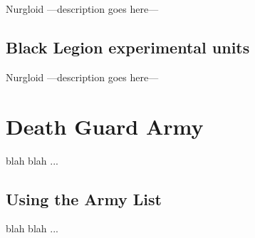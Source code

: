 \documentclass[a4paper, twocolumn]{article}
\begin{document}
\unit{Nurgloid} {							%
	---description goes here---
}
\statsEND									%

\subsection{Black Legion experimental units}

\unit{Nurgloid} {							%
	---description goes here---
}
\statsEND									%

\twocolumn
%
\clearpage
\section{Death Guard Army}
blah blah ...
\subsection{Using the Army List}
blah blah ...
\end{document}
